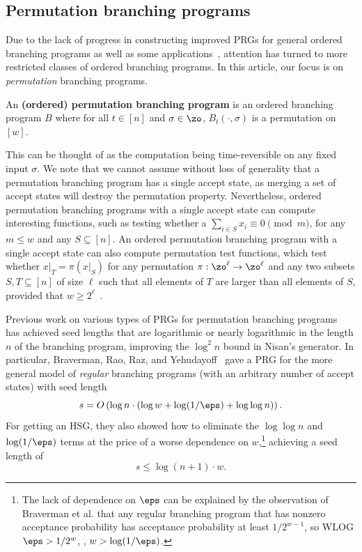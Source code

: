 	
\subsection{Permutation branching programs}\label{subsec:PBP_overview}

Due to the lack of progress in constructing improved PRGs for general ordered branching programs as well as some applications~\cite{Indyk06,KaplanNaRe05}, attention has turned to more restricted classes of ordered branching programs.  In this %
article, %
our focus is on \emph{permutation} branching programs. %
	
	\begin{definition}\label{def:prbp}An \textbf{(ordered) permutation branching program} is an ordered branching program $B$ where for all $t \in [n]$ and $\sigma \in \zo$, $B_t(\cdot,\sigma)$ is a permutation on $[w]$. 
	\end{definition}
	This can be thought of as the computation being time-reversible on any fixed input $\sigma$. We note that we cannot assume without loss of generality that a permutation branching program has a single accept state, as merging a set of accept states will destroy the permutation property. Nevertheless, ordered permutation branching programs with a single accept state can compute interesting functions, such as testing
	whether a $\sum_{i\in S} x_i \equiv 0 \pmod m$, for any $m\leq w$ and any $S\subseteq [n]$.  An ordered permutation branching program with a single accept state can also compute permutation test functions, which test whether $x|_T = \pi(x|_S)$ for any permutation $\pi : \zo^\ell\rightarrow \zo^\ell$ and any two subsets $S,T\subseteq [n]$ of size $\ell$ such that all elements of $T$ are larger than all elements of $S$, provided that $w\geq 2^{\ell}$~\cite{HozaPyVa21}.
	
	Previous %
work %
on various types of PRGs for permutation branching programs~\cite{RozenmanVa05,ReingoldTrVa06,BravermanRaRaYe10,KouckyNiPu11,De11,Steinke12,HozaPyVa21} %
has  %
achieved seed lengths that are logarithmic or nearly logarithmic in the length $n$ of the branching program, improving the $\log^2 n$ bound in Nisan's generator. In particular, Braverman, Rao,
Raz, and Yehudayoff~\cite{BravermanRaRaYe10} gave a PRG for the more general model of \emph{regular} branching programs (with an arbitrary number of accept states) with seed length
	$$s=O\left(\log n\cdot (\log w + \log(1/\eps)+\log\log n)\right).$$
For getting an %
    HSG, they also showed how to %
    eliminate
	the $\log\log n$ and $\log(1/\eps)$ terms at the price of a worse dependence on $w$,\footnote{The lack of dependence on $\eps$ can be explained by the observation of Braverman et al. that any regular branching program that 
	has nonzero acceptance probability has acceptance probability at least
	$1/2^{w-1}$, so WLOG $\eps> 1/2^w$, \ie, $w> \log(1/\eps)$.} 
	achieving a seed length of
	$$s\leq \log(n+1) \cdot w.$$

